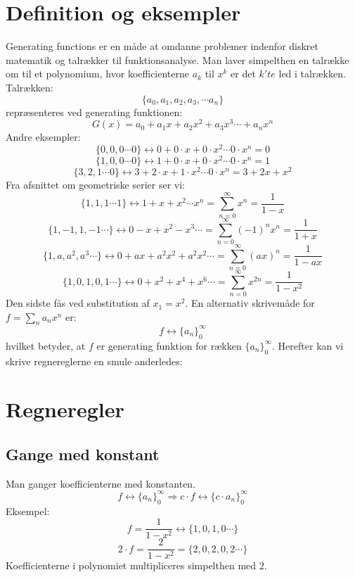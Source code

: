\section*{Definition og eksempler}
Generating functions er en måde at omdanne problemer indenfor diskret matematik og talrækker til funktionsanalyse. Man laver simpelthen en talrække om til et polynomium, hvor koefficienterne \(a_{k}\) til \(x^{k}\) er det \(k'te\) led i talrækken. Talrækken:
\[\{a_{0},a_{1},a_{2},a_{3},\dotsm a_{n}\}\] repræsenteres ved generating funktionen:
\[G(x)=a_{0}+a_{1}x+a_{2}x^{2}+a_{3}x^{3} \dotsm +a_{n}x^{n}\]
Andre eksempler:
\[\{0,0,0 \dotsm 0\} \leftrightarrow 0+0 \cdot x+0 \cdot x^{2} \dotsm 0 \cdot x^{n}=0\]
\[\{1,0,0 \dotsm 0\} \leftrightarrow 1+0 \cdot x+0 \cdot x^{2} \dotsm 0 \cdot x^{n}=1\]
\[\{3,2,1 \dotsm 0\} \leftrightarrow 3+2 \cdot x+1 \cdot x^{2} \dotsm 0 \cdot x^{n}=3+2x+x^{2}\]
Fra afsnittet om geometriske serier ser vi:
\[\{1,1,1 \dotsm 1\} \leftrightarrow 1+x+x^{2} \dotsm  x^{n}=\sum_{n=0}^{\infty}x^{n}=\frac{1}{1-x}\]
\[\{1,-1,1,-1 \dotsm \} \leftrightarrow 0-x+x^{2}-x^{3}\dotsm=\sum_{n=0}^{\infty}(-1)^{n}x^{n}=\frac{1}{1+x}\]
\[\{1,a,a^{2},a^{3} \dotsm \} \leftrightarrow 0+ax+a^{2}x^{2}+ a^{2}x^{2}\dotsm=\sum_{n=0}^{\infty}(ax)^{n}=\frac{1}{1-ax}\]
\[\{1,0,1,0,1 \dotsm \} \leftrightarrow 0+x^{2}+ x^{4}+x^{6}\dotsm=\sum_{n=0}^{\infty}x^{2n}=\frac{1}{1-x^{2}}\]
Den sidste fås ved substitution af \(x_{1}=x^{2}\).
En alternativ skrivemåde for \(f=\sum_{n}a_{n}x^{n}\) er:
\[f \leftrightarrow \{a_{n}\}_{0}^{\infty}\]
hvilket betyder, at \(f\) er generating funktion for rækken \(\{a_{n}\}_{0}^{\infty}\). Herefter kan vi skrive regnereglerne en smule anderledes:\\
\section*{Regneregler}
\subsection*{Gange med konstant}
Man ganger koefficienterne med konstanten.
\[f \leftrightarrow \{a_{n}\}_{0}^{\infty} \Rightarrow c \cdot f \leftrightarrow \{c \cdot a_{n}\}_{0}^{\infty}\]
Eksempel:
\[f=\frac{1}{1-x^{2}} \leftrightarrow \{1,0,1,0 \dotsm\}\]
\[2 \cdot f=\frac{2}{1-x^{2}}=\{2,0,2,0,2 \dotsm\}\]
Koefficienterne i polynomiet multipliceres simpelthen med \(2\). 
